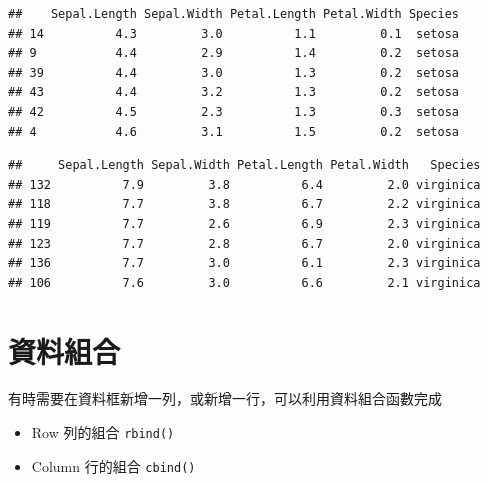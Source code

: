 \documentclass[]{book}
\newenvironment{Shaded}{\begin{snugshade}}{\end{snugshade}}
\newcommand{\KeywordTok}[1]{\textcolor[rgb]{0.13,0.29,0.53}{\textbf{{#1}}}}
\newcommand{\DataTypeTok}[1]{\textcolor[rgb]{0.13,0.29,0.53}{{#1}}}
\newcommand{\NormalTok}[1]{{#1}}
\providecommand{\tightlist}{%
  \setlength{\itemsep}{0pt}\setlength{\parskip}{0pt}}
\theoremstyle{definition}
\theoremstyle{definition}
\theoremstyle{remark}
\begin{document}
\begin{Shaded}
\end{Shaded}

\begin{verbatim}
##    Sepal.Length Sepal.Width Petal.Length Petal.Width Species
## 14          4.3         3.0          1.1         0.1  setosa
## 9           4.4         2.9          1.4         0.2  setosa
## 39          4.4         3.0          1.3         0.2  setosa
## 43          4.4         3.2          1.3         0.2  setosa
## 42          4.5         2.3          1.3         0.3  setosa
## 4           4.6         3.1          1.5         0.2  setosa
\end{verbatim}

\begin{Shaded}
\end{Shaded}

\begin{verbatim}
##     Sepal.Length Sepal.Width Petal.Length Petal.Width   Species
## 132          7.9         3.8          6.4         2.0 virginica
## 118          7.7         3.8          6.7         2.2 virginica
## 119          7.7         2.6          6.9         2.3 virginica
## 123          7.7         2.8          6.7         2.0 virginica
## 136          7.7         3.0          6.1         2.3 virginica
## 106          7.6         3.0          6.6         2.1 virginica
\end{verbatim}

\section{資料組合}

有時需要在資料框新增一列，或新增一行，可以利用資料組合函數完成

\begin{itemize}
\tightlist
\item
  Row 列的組合 \texttt{rbind()}
\item
  Column 行的組合 \texttt{cbind()}
\end{itemize}
\end{document}
